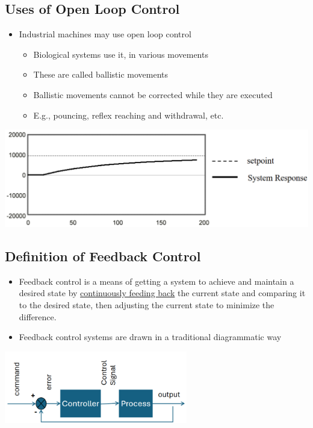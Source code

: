 \documentclass[10pt]{article}
\begin{document}
\subsection*{Uses of Open Loop Control}
\begin{itemize}
	\item Industrial machines may use open loop control
	\begin{itemize}
        \item Biological systems use it, in various movements
        \item These are called ballistic movements
        \item Ballistic movements cannot be corrected while they are executed
        \item E.g., pouncing, reflex reaching and withdrawal, etc.
    \end{itemize}
\end{itemize}
\begin{center} 
	\includegraphics*[width=\textwidth]{L2_4.png} 
\end{center}

\subsection*{Definition of Feedback Control}
\begin{itemize}
	\item Feedback control is a means of getting a system to achieve and maintain a desired state by \underline{continuously feeding back} the current state and comparing it to the desired state, then adjusting the current state to minimize the difference.
	\item Feedback control systems are drawn in a traditional diagrammatic way
\end{itemize}
\begin{center} 
	\includegraphics*[width=0.6\textwidth]{L2_5.png}
\end{center}
\end{document}
